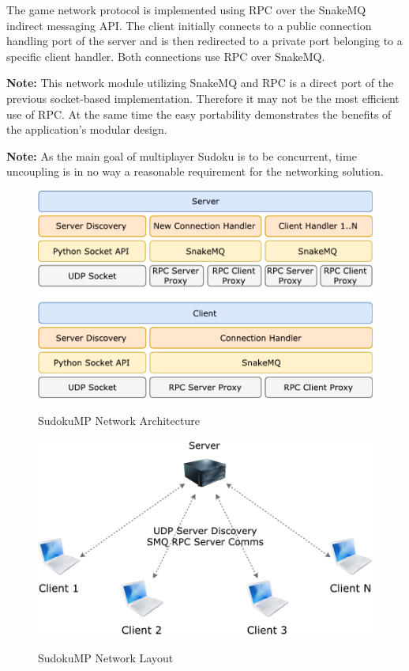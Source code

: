 \documentclass[a4paper]{article}
\begin{document}
The game network protocol is implemented using RPC over the SnakeMQ indirect messaging API. The client initially connects to a public connection handling port of the server and is then redirected to a private port belonging to a specific client handler. Both connections use RPC over SnakeMQ.

\textbf{Note:} This network module utilizing SnakeMQ and RPC is a direct port of the previous socket-based implementation. Therefore it may not be the most efficient use of RPC. At the same time the easy portability demonstrates the benefits of the application's modular design.

\textbf{Note:} As the main goal of multiplayer Sudoku is to be concurrent, time uncoupling is in no way a reasonable requirement for the networking solution.

\vfill

\begin{figure}[hb] \centering
	{\includegraphics[width=0.87\linewidth]{SMP_Network_Architecture}}
	\caption{SudokuMP Network Architecture}
	\label{fig:networkArchitecture}
\end{figure}

\vfill

\begin{figure}[htb] \centering
	{\includegraphics[width=0.87\linewidth]{SMP_Network_Layout}}
	\caption{SudokuMP Network Layout}
	\label{fig:networkLayout}
\end{figure}
\end{document}
